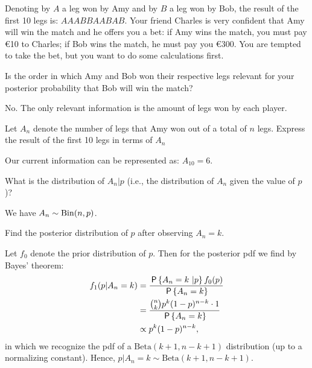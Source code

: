 \documentclass[assignments]{subfiles}
\begin{document}
Denoting by $A$ a leg won by Amy and by $B$ a leg won by Bob, the result of the first 10 legs is: $AAABBAABAB$. Your friend Charles is very confident that Amy will win the match and he offers you a bet: if Amy wins the match, you must pay €10 to Charles; if Bob wins the match, he must pay you €300. You are tempted to take the bet, but you want to do some calculations first.
\begin{exercise}
Is the order in which Amy and Bob won their respective legs relevant for your posterior probability that Bob will win the match?
\begin{solution}
No. The only relevant information is the amount of legs won by each player.
\end{solution}
\end{exercise}

\begin{exercise}
Let $A_n$ denote the number of legs that Amy won out of a total of $n$ legs. Express the result of the first 10 legs in terms of $A_n$
\begin{solution}
Our current information can be represented as: $A_{10} = 6$.
\end{solution}
\end{exercise}

\begin{exercise}
What is the distribution of $A_n | p$ (i.e., the distribution of $A_n$ given the value of $p$)?
\begin{solution}
We have $A_n \sim \Bin{n,p}$.
\end{solution}
\end{exercise}

\begin{exercise}
Find the posterior distribution of $p$ after observing $A_n = k$.
\begin{solution}
Let $f_0$ denote the prior distribution of $p$. Then for the posterior pdf we find by Bayes' theorem:
\begin{align}
    f_1(p|A_n = k) &= \frac{\P{A_n = k \ | p} f_0(p)}{\P{A_n = k}} \\
    &= \frac{{n \choose k} p^k (1-p)^{n-k} \cdot 1}{\P{A_n = k}} \\
    &\propto p^k (1-p)^{n-k},
\end{align}
in which we recognize the pdf of a $\text{Beta}(k+1,n-k+1)$ distribution (up to a normalizing constant). Hence, $p |A_n = k \sim \text{Beta}(k+1,n-k+1)$.
\end{solution}
\end{exercise}
\end{document}
